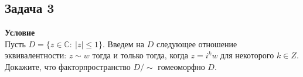 			
		\subsection*{Задача 3}
		\textbf{Условие}\\
		Пусть $D=\{z \in \mathbb{C}:\ |z| \leqslant 1\}$. Введем на $D$ следующее отношение эквивалентности: $z \sim w$ тогда и только тогда, когда $z = i^{k}w$ для некоторого $k\in Z$. Докажите, что факторпространство $D/\sim$ гомеоморфно $D$.\\
		\\
		\begin{comment}
		\textbf{Решение}\\
		Построим $\varphi: D \to D$, $z \to \frac{z^4}{|z|^3},\ 0\to 0$\\
		\begin{wrapfigure}{h}{0.2\textwidth}
		\begin{tikzpicture}[node distance=2cm, auto]
		\node (X) {$D$};
		\node(Y) [right of=X] {$D$};
		\node (X1) [below of=X] {$D\slash_{\sim}$};
		\draw[->](X) to node [left]{$q$}(X1);
		\draw[->](X1) to node [right]{$\exists!\ h\text{ -- гомео}$}(Y);
		\draw[->](X) to node {$\varphi$}(Y);
		\end{tikzpicture}
		\end{wrapfigure}
		
		Покажем, что $\varphi$ -- факторно\\
		$D \supset \varphi^{-1}(U)$ -- открыто, докажем что это равносильно тому, что $D \supset U$ -- открыто\\
		$(\Leftarrow)$\\
		так как $\varphi$ непрерывно (в нуле непрерывно, так как любой открытый шар $B_r(0),\ r<1$ переходит в себя)\\
		$(\Rightarrow)$\\
		$\forall x \in \varphi^{-1}(U)$ -- откыт, есть открытая окрестность\\
		\\
		Такая окрестность перейдёт в окрестность такого же вида, но с большим углом и останется открытой $\Rightarrow$ $U$ -- открыт.\\
		При этом $|z_1| = |\frac{z^4_1}{|z_1|^3}| = |\frac{z^4_2}{|z_2|^3}| = |z_2|\ \Rightarrow\ \frac{z^4_1}{|z_1|^3} = \frac{z^4_2}{|z_2|^3}\ \Leftrightarrow\ z^4_1 = z^4_2\ \Leftrightarrow\ (z^2_1- z^2_2)(z^2_1 - i^2 z^2_2) = 0\ \Leftrightarrow\ (z_1 - z_2)(z_1 - i z_2)(z_1 - i z_2)(z_1 - i^3 z_2) = 0$\\
		Поэтому $\varphi(z_1) = \varphi(z_2)\ \Leftrightarrow\ z_1 \sim z_2$, то есть $\exists!\ h:\ D\slash_{\sim} \to D$\\
		\\
		\end{comment}
